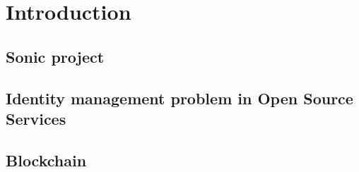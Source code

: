 \section{Introduction}
\label{S:1}

\subsection{Sonic project}

\subsection{Identity management problem in Open Source Services}
\subsection{Blockchain}